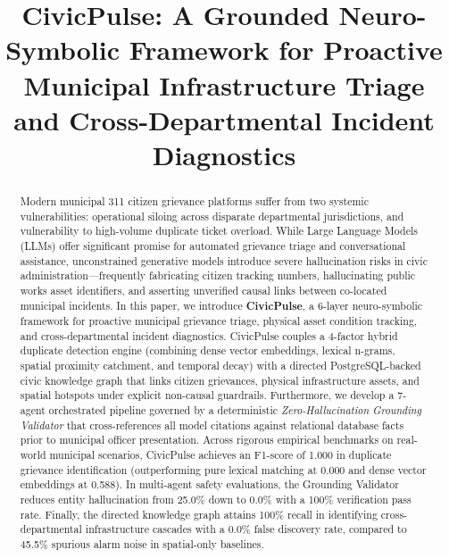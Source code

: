 \documentclass[conference]{IEEEtran}
\begin{document}
\title{CivicPulse: A Grounded Neuro-Symbolic Framework for Proactive Municipal Infrastructure Triage and Cross-Departmental Incident Diagnostics}

\author{
}

\maketitle

\begin{abstract}
Modern municipal 311 citizen grievance platforms suffer from two systemic vulnerabilities: operational siloing across disparate departmental jurisdictions, and vulnerability to high-volume duplicate ticket overload. While Large Language Models (LLMs) offer significant promise for automated grievance triage and conversational assistance, unconstrained generative models introduce severe hallucination risks in civic administration---frequently fabricating citizen tracking numbers, hallucinating public works asset identifiers, and asserting unverified causal links between co-located municipal incidents. In this paper, we introduce \textbf{CivicPulse}, a 6-layer neuro-symbolic framework for proactive municipal grievance triage, physical asset condition tracking, and cross-departmental incident diagnostics. CivicPulse couples a 4-factor hybrid duplicate detection engine (combining dense vector embeddings, lexical n-grams, spatial proximity catchment, and temporal decay) with a directed PostgreSQL-backed civic knowledge graph that links citizen grievances, physical infrastructure assets, and spatial hotspots under explicit non-causal guardrails. Furthermore, we develop a 7-agent orchestrated pipeline governed by a deterministic \textit{Zero-Hallucination Grounding Validator} that cross-references all model citations against relational database facts prior to municipal officer presentation. Across rigorous empirical benchmarks on real-world municipal scenarios, CivicPulse achieves an F1-score of 1.000 in duplicate grievance identification (outperforming pure lexical matching at 0.000 and dense vector embeddings at 0.588). In multi-agent safety evaluations, the Grounding Validator reduces entity hallucination from 25.0\% down to 0.0\% with a 100\% verification pass rate. Finally, the directed knowledge graph attains 100\% recall in identifying cross-departmental infrastructure cascades with a 0.0\% false discovery rate, compared to 45.5\% spurious alarm noise in spatial-only baselines.
\end{abstract}
\end{document}
